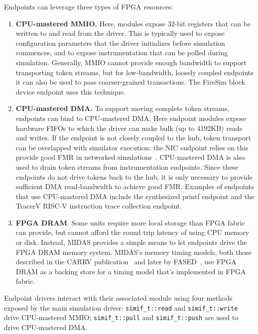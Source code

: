Endpoints can leverage three types of FPGA resources:

\begin{enumerate}
\item \textbf{CPU-mastered MMIO.} Here, modules expose 32-bit registers that can be
    written to and read from the driver. This is typically used to expose
    configuration  parameters that the driver initializes before simulation
    commences, and to expose instrumentation that can be polled during
    simulation. Generally, MMIO cannot provide enough bandwidth to support transporting token streams,
    but for low-bandwidth, loosely coupled endpoints it can also be used to pass coarser-grained transactions.
    The FireSim block device endpoint uses this technique.

\item \textbf{CPU-mastered DMA.} To support moving complete token streams, endpoints can
    bind to CPU-mastered DMA. Here endpoint modules expose hardware FIFOs to which the driver
    can make bulk (up to 4192KB) reads and writes. If the endpoint is not closely coupled
    to the hub, token transport can be overlapped with simulator execution: the NIC endpoint relies on this
    provide good FMR in networked simulations~\cite{FireSim}. CPU-mastered DMA is also used 
    to drain token streams from instrumentation endpoints. Since these endpoints do not drive
    tokens back to the hub, it is only necessary to provide sufficient DMA
    read-bandwidth to achieve good FMR.
    Examples of endpoints that use CPU-mastered DMA include the synthesized printf endpoint and the TracerV
    RISC-V instruction trace collection endpoint.

\item \textbf{FPGA DRAM}. Some units require more local storage than FPGA fabric can
    provide, but cannot afford the round trip latency of using CPU memory or
    disk. Instead, MIDAS provides a simple means to let endpoints drive the FPGA
    DRAM memory system.  MIDAS's memory timing models, both those described
    in the CARRV publication~\cite{MIDAS} and later by FASED~\cite{FASED},
    use FPGA DRAM as a backing store for a timing model that's implemented
    in FPGA fabric.
\end{enumerate}

Endpoint drivers interact with their associated module using four methods
exposed by the main simulation driver: \texttt{simif\_t::read} and
\texttt{simif\_t::write} drive CPU-mastered MMIO; \texttt{simif\_t::pull} and
\texttt{simif\_t::push} are used to drive CPU-mastered DMA.

